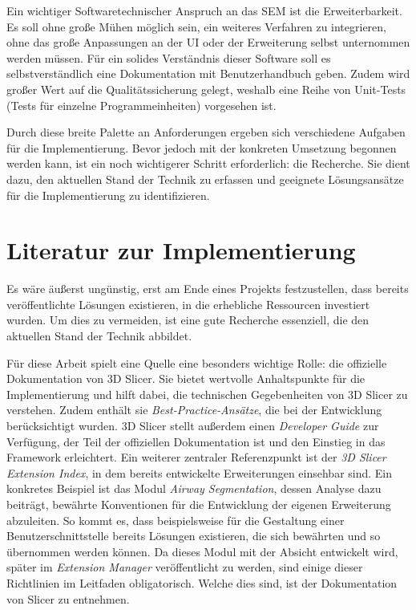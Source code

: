Ein wichtiger Softwaretechnischer Anspruch an das \ac{SEM} ist die
Erweiterbarkeit. Es soll ohne große Mühen möglich sein, ein weiteres Verfahren
zu integrieren, ohne das große Anpassungen an der \ac{UI} oder der Erweiterung
selbst unternommen werden müssen. Für ein solides Verständnis dieser Software soll
es selbstverständlich eine Dokumentation mit Benutzerhandbuch geben. Zudem wird
großer Wert auf die Qualitätssicherung gelegt, weshalb eine Reihe von Unit-Tests
(Tests für einzelne Programmeinheiten) vorgesehen ist.

Durch diese breite Palette an Anforderungen ergeben sich verschiedene Aufgaben für
die Implementierung. Bevor jedoch mit der konkreten Umsetzung begonnen werden
kann, ist ein noch wichtigerer Schritt erforderlich: die Recherche. Sie dient dazu,
den aktuellen Stand der Technik zu erfassen und geeignete Lösungsansätze für die
Implementierung zu identifizieren.

\section{Literatur zur Implementierung}
Es wäre äußerst ungünstig, erst am Ende eines Projekts festzustellen, dass
bereits veröffentlichte Lösungen existieren, in die erhebliche Ressourcen investiert
wurden. Um dies zu vermeiden, ist eine gute Recherche essenziell, die den
aktuellen Stand der Technik abbildet.

Für diese Arbeit spielt eine Quelle eine besonders wichtige Rolle: die offizielle
Dokumentation von 3D Slicer. Sie bietet wertvolle Anhaltspunkte für die
Implementierung und hilft dabei, die technischen Gegebenheiten von 3D Slicer zu verstehen.
Zudem enthält sie \textit{Best-Practice-Ansätze}, die bei der Entwicklung
berücksichtigt wurden. 3D Slicer stellt außerdem einen \textit{Developer Guide}
zur Verfügung, der Teil der offiziellen Dokumentation ist und den Einstieg in das
Framework erleichtert. Ein weiterer zentraler Referenzpunkt ist der \textit{3D
Slicer Extension Index}, in dem bereits entwickelte Erweiterungen einsehbar sind.
Ein konkretes Beispiel ist das Modul \textit{Airway Segmentation}, dessen Analyse
dazu beiträgt, bewährte Konventionen für die Entwicklung der eigenen Erweiterung
abzuleiten. So kommt es, dass beispielsweise für die Gestaltung einer
Benutzerschnittstelle bereits Lösungen existieren, die sich bewährten und so übernommen
werden können. Da dieses Modul mit der Absicht entwickelt wird, später im \textit{Extension
Manager} veröffentlicht zu werden, sind einige dieser Richtlinien im Leitfaden obligatorisch.
Welche dies sind, ist der Dokumentation von Slicer zu entnehmen.

